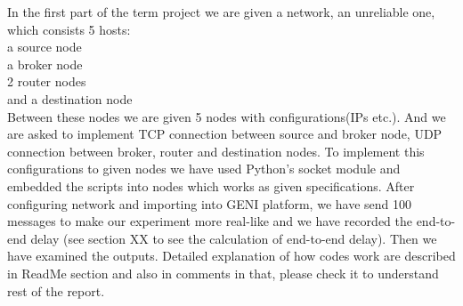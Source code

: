 In the first part of the term project we are given a network, an unreliable one, which consists 5 hosts:\\
    a source node\\
    a broker node\\
    2 router nodes\\
    and a destination node\\

Between these nodes we are given 5 nodes with configurations(IPs etc.). And we are asked to implement TCP connection between source and broker node, UDP connection between broker, router and destination nodes. To implement this configurations to given nodes we have used Python's socket module and embedded the scripts into nodes which works as given specifications. After configuring network and importing into GENI platform, we have send 100 messages to make our experiment more real-like and we have recorded the end-to-end delay (see section XX to see the calculation of end-to-end delay). Then we have examined the outputs.
Detailed explanation of how codes work are described in ReadMe section and also in comments in that, please check it to understand rest of the report.